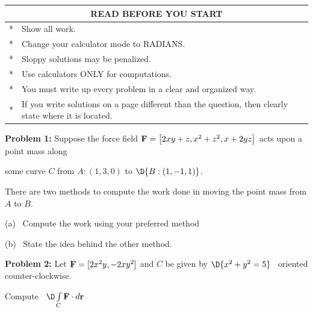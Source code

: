\documentclass[12pt]{amsart}
\numberwithin{equation}{section}
\begin{document}
\begin{center}
\vspace{1.0cm}

	{\setlength{\extrarowheight}{0.2cm}
	\begin{tabular}{| cp{16cm} |}
		\hline
		\multicolumn{2}{|c|}{{\bf READ BEFORE YOU START}} \\
		\hline
		 * & Show all work.\\
		 * & Change your calculator mode to RADIANS.\\
		 * & Sloppy solutions may be penalized.\\
		 * & Use calculators ONLY for computations.\\
		 * & You must write up every problem in a clear and organized way.\\
		 * & If you write solutions on a page different than the question, then clearly state where it is located.\\
		\hline
	\end{tabular}}

\end{center}

\vspace{1.0cm}

\thispagestyle{empty}
\newpage
\thispagestyle{empty}

{\bf Problem 1:} Suppose the force field ${\bf F} = \left[2xy+z, x^2+z^2, x+2yz\right]$ acts upon a point mass along  

some curve $C$ from $A:(1,3,0)$ to $\D{B:\left(1,-1,1\right)}$.

\vspace{0.2cm}

There are two methods to compute the work done in moving the point mass from $A$ to $B$.

\vspace{0.2cm}

(a) \, Compute the work using your preferred method

\vspace{21.7cm}

(b) \, State the idea behind the other method.

\thispagestyle{empty}
\newpage
\thispagestyle{empty}

{\bf Problem 2:} Let $\text{\bf F} = [2x^2y,-2xy^2]$ and $C$ be given by $\D{x^2+y^2=5}$ \, oriented counter-clockwise. \, 

Compute \, $\D \int \limits_{C} \text{\bf F}\cdot d\text{\bf r}$ 

\thispagestyle{empty}
\newpage
\thispagestyle{empty}
\end{document}
